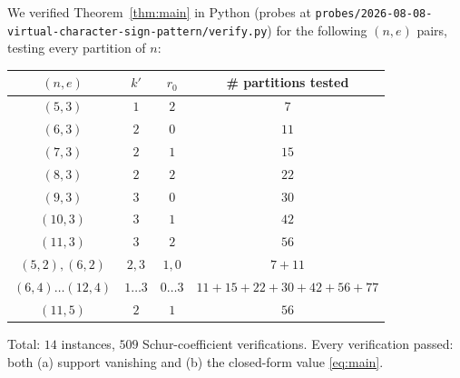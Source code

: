 \documentclass[11pt]{article}
\theoremstyle{definition}
\theoremstyle{remark}
\begin{document}
We verified Theorem~\ref{thm:main} in Python (probes at
\texttt{probes/2026-08-08-virtual-character-sign-pattern/verify.py}) for the
following $(n,e)$ pairs, testing every partition of $n$:
\begin{center}
\begin{tabular}{cccc}
\hline
$(n,e)$ & $k'$ & $r_0$ & \# partitions tested \\
\hline
$(5,3)$ & $1$ & $2$ & $7$ \\
$(6,3)$ & $2$ & $0$ & $11$ \\
$(7,3)$ & $2$ & $1$ & $15$ \\
$(8,3)$ & $2$ & $2$ & $22$ \\
$(9,3)$ & $3$ & $0$ & $30$ \\
$(10,3)$ & $3$ & $1$ & $42$ \\
$(11,3)$ & $3$ & $2$ & $56$ \\
$(5,2),(6,2)$ & $2,3$ & $1,0$ & $7+11$ \\
$(6,4)\ldots(12,4)$ & $1\ldots 3$ & $0\ldots 3$ & $11+15+22+30+42+56+77$ \\
$(11,5)$ & $2$ & $1$ & $56$ \\
\hline
\end{tabular}
\end{center}
Total: $14$ instances, $509$ Schur-coefficient verifications. Every
verification passed: both (a) support vanishing and (b) the closed-form
value \eqref{eq:main}.
\end{document}
